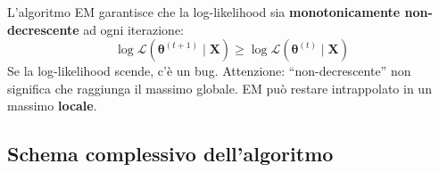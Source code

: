 \documentclass[11pt,a4paper]{article}
\begin{document}
\begin{infobox}
L'algoritmo EM garantisce che la log-likelihood sia \textbf{monotonicamente non-decrescente} ad ogni iterazione:
$$\log\mathcal{L}(\boldsymbol{\theta}^{(t+1)}\mid\mathbf{X}) \geq \log\mathcal{L}(\boldsymbol{\theta}^{(t)}\mid\mathbf{X})$$
Se la log-likelihood scende, c'\`e un bug. Attenzione: ``non-decrescente'' non significa che raggiunga il massimo globale. EM pu\`o restare intrappolato in un massimo \textbf{locale}.
\end{infobox}

\subsection{Schema complessivo dell'algoritmo}
\end{document}
